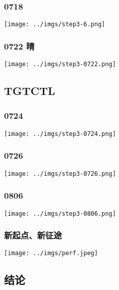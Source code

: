 \documentclass[UTF8,8pt,xcolor=dvipsnames]{beamer}
\begin{document}
\begin{frame}[fragile]
    \frametitle{0718}
    \begin{center}
        \texttt{[image: ../imgs/step3-6.png]}
    \end{center}
\end{frame}

\begin{frame}[fragile]
    \frametitle{0722 晴}
    \begin{center}
        \texttt{[image: ../imgs/step3-0722.png]}
    \end{center}
\end{frame}

\subsection{TGTCTL}

\begin{frame}[fragile]
    \frametitle{0724}
    \begin{center}
        \texttt{[image: ../imgs/step3-0724.png]}
    \end{center}
\end{frame}

\begin{frame}[fragile]
    \frametitle{0726}
    \begin{center}
        \texttt{[image: ../imgs/step3-0726.png]}
    \end{center}
\end{frame}

\begin{frame}[fragile]
    \frametitle{0806}
    \begin{center}
        \texttt{[image: ../imgs/step3-0806.png]}
    \end{center}
\end{frame}

\begin{frame}[fragile]
    \frametitle{新起点、新征途}
    \begin{center}
        \texttt{[image: ../imgs/perf.jpeg]}
    \end{center}
\end{frame}

\subsection{结论}
\end{document}
